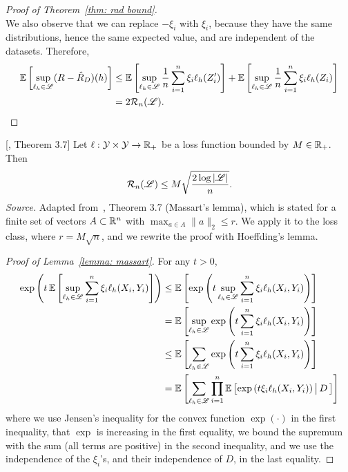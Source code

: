 \documentclass[reqno]{amsart}
\begin{document}
\begin{theorem}
\begin{proof}[Proof of Theorem~\ref{thm: rad bound}]
\[\]
We also observe that we can replace $-\xi_i$ with $\xi_i$, because they have the same distributions, hence the same expected value, and are independent of the datasets. Therefore,
\begin{align*}
\mathbb{E}\left[\sup_{\ell_h\in\mathscr{L}}(R-\hat R_D)(h)\right] &\le \mathbb{E}\left[\sup_{\ell_h\in\mathscr{L}}\frac1n\sum_{i=1}^n \xi_i\ell_h(Z_i')\right] + \mathbb{E}\left[\sup_{\ell_h\in\mathscr{L}}\frac1n\sum_{i=1}^n \xi_i\ell_h(Z_i)\right] \\
&= 2\mathcal R_n(\mathscr{L}).
\end{align*}
\end{proof}
\end{theorem}

\begin{lemma}[Massart]\label{lemma: massart} [\cite{mohri2018foundations}, Theorem 3.7]
Let $\ell:\mathcal{Y}\times\mathcal{Y}\to\mathbb{R}_+$ be a loss function bounded by $M\in\mathbb{R}_+$. Then
\[
\mathcal R_n(\mathscr{L}) \le M\sqrt{\frac{2\log \vert\mathscr{L}\vert}{n}}.
\]
\textnormal{\emph{Source.} Adapted from~\cite{mohri2018foundations}, Theorem 3.7 (Massart's lemma), which is stated for a finite set of vectors $A\subset\mathbb{R}^n$ with $\max_{a\in A}\|a\|_2\le r$. We apply it to the loss class, where $r = M\sqrt n$, and we rewrite the proof with Hoeffding's lemma.}

\begin{proof}[Proof of Lemma~\ref{lemma: massart}]
For any $t>0$,
\begin{align}
\exp\left(t\,\mathbb{E}\left[\sup_{\ell_h\in\mathscr{L}}\sum_{i=1}^n \xi_i\ell_h(X_i,Y_i)\right]\right)
&\le \mathbb{E}\left[\exp\left(t\sup_{\ell_h\in\mathscr{L}}\sum_{i=1}^n \xi_i\ell_h(X_i,Y_i)\right)\right] \notag\\
&= \mathbb{E}\left[\sup_{\ell_h\in\mathscr{L}}\exp\left(t\sum_{i=1}^n \xi_i\ell_h(X_i,Y_i)\right)\right] \notag\\
&\le \mathbb{E}\left[\sum_{\ell_h\in\mathscr{L}}\exp\left(t\sum_{i=1}^n \xi_i\ell_h(X_i,Y_i)\right)\right] \notag\\
&= \mathbb{E}\left[\sum_{\ell_h\in\mathscr{L}}\prod_{i=1}^n \mathbb{E}\left[\exp\left(t\xi_i\ell_h(X_i,Y_i)\right)\big\vert \,D\,\right]\right]
\label{app/eq: massart start}
\end{align}
where we use Jensen's inequality for the convex function $\exp(\cdot)$ in the first inequality, that $\exp$ is increasing in the first equality, we bound the supremum with the sum (all terms are positive) in the second inequality, and we use the independence of the $\xi_i$'s, and their independence of $D$, in the last equality.


\end{proof}
\end{lemma}
\end{document}

